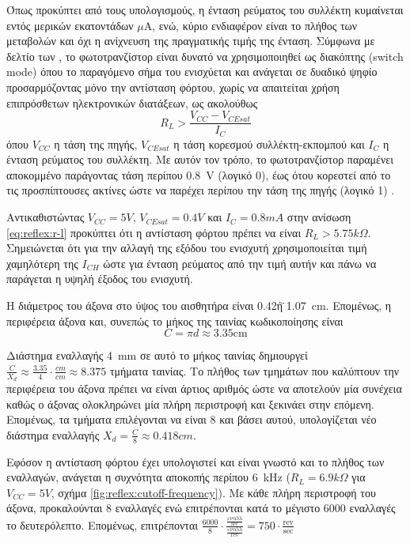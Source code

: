 Όπως προκύπτει από τους υπολογισμούς, η ένταση ρεύματος του συλλέκτη κυμαίνεται
εντός μερικών εκατοντάδων $\mu$A, ενώ, κύριο ενδιαφέρον είναι το πλήθος των
μεταβολών και όχι η ανίχνευση της πραγματικής τιμής της ένταση.
Σύμφωνα με δελτίο των \textcites{optek04}{fairchild02}, το φωτοτρανζίστορ είναι
δυνατό να χρησιμοποιηθεί ως διακόπτης (switch mode) όπου το παραγόμενο σήμα του
ενισχύεται και ανάγεται σε δυαδικό ψηφίο προσαρμόζοντας μόνο την αντίσταση
φόρτου, χωρίς να απαιτείται χρήση επιπρόσθετων ηλεκτρονικών διατάξεων, ως
ακολούθως
\begin{equation}
R_L > \frac{V_{CC} - V_{CEsat}}{I_C} \label{eq:reflex:r-l}
\end{equation}
όπου $V_{CC}$ η τάση της πηγής, $V_{CEsat}$ η τάση κορεσμού συλλέκτη-εκπομπού
και $I_C$ η ένταση ρεύματος του συλλέκτη. Με αυτόν τον τρόπο, το φωτοτρανζίστορ
παραμένει αποκομμένο παράγοντας τάση περίπου 0.8~V (λογικό 0), έως ότου κορεστεί
από το τις προσπίπτουσες ακτίνες ώστε να παρέχει περίπου την τάση της πηγής
(λογικό 1) \parencite{fairchild02}.

Αντικαθιστώντας $V_{CC} = 5 V$, $V_{CEsat} = 0.4 V$ και $I_C = 0.8 mA$ στην
ανίσωση \eqref{eq:reflex:r-l} προκύπτει ότι η αντίσταση φόρτου πρέπει να είναι
$R_L > 5.75 k\Omega$. Σημειώνεται ότι για την αλλαγή της εξόδου του ενισχυτή
χρησιμοποιείται τιμή χαμηλότερη της $I_{CH}$ ώστε για ένταση ρεύματος από την
τιμή αυτήν και πάνω να παράγεται η υψηλή έξοδος του ενισχυτή.

Η διάμετρος του άξονα στο ύψος του αισθητήρα είναι 0.42\" ή 1.07~cm. Επομένως, η
περιφέρεια άξονα και, συνεπώς το μήκος της ταινίας κωδικοποίησης είναι
\begin{equation}
C = \pi{}d \approx 3.35 \text{cm}
\end{equation}

Διάστημα εναλλαγής 4~mm σε αυτό το μήκος ταινίας δημιουργεί
$\frac{C}{X_d} \approx \frac{3.35}{4} \cdot \frac{cm}{cm} \approx 8.375$ τμήματα
ταινίας. Το πλήθος των τμημάτων που καλύπτουν την περιφέρεια του άξονα πρέπει να
είναι άρτιος αριθμός ώστε να αποτελούν μία συνέχεια καθώς ο άξονας ολοκληρώνει
μία πλήρη περιστροφή και ξεκινάει στην επόμενη. Επομένως, τα τμήματα επιλέγονται
να είναι 8 και βάσει αυτού, υπολογίζεται νέο διάστημα εναλλαγής
$X_d = \frac{C}{8} \approx 0.418cm$.

Εφόσον η αντίσταση φόρτου έχει υπολογιστεί και είναι γνωστό και το πλήθος των
εναλλαγών, ανάγεται η συχνότητα αποκοπής περίπου 6~kHz ($R_L = 6.9 k\Omega$ για
$V_{CC} = 5 V$, σχήμα \ref{fig:reflex:cutoff-frequency}). Με κάθε πλήρη
περιστροφή του άξονα, προκαλούνται 8 εναλλαγές ενώ επιτρέπονται κατά το μέγιστο
6000 εναλλαγές το δευτερόλεπτο. Επομένως, επιτρέπονται 
$\frac{6000}{8} \cdot
    \frac{
        \frac{\text{εναλλ}}{\text{sec}}
    }{
    \frac{\text{εναλλ}}{\text{rev}}} = 
750 \cdot \frac{\text{rev}}{\text{sec}}$
